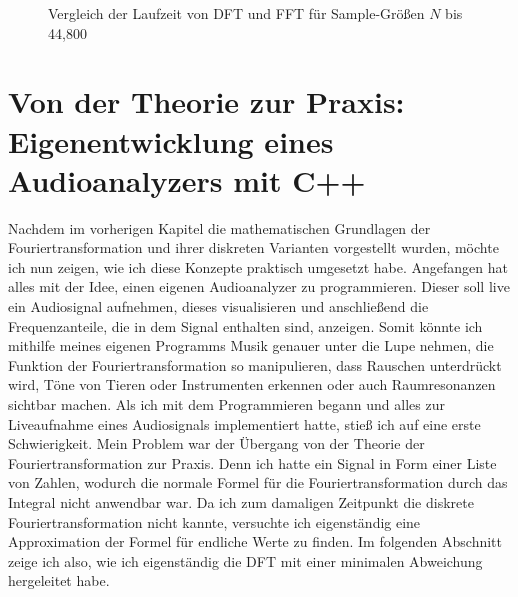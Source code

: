 \documentclass[a4paper,12pt]{article}
\theoremstyle{definition}
\theoremstyle{remark}
\begin{document}
\begin{figure}[H]
\centering
{}
\caption{Vergleich der Laufzeit von DFT und FFT für Sample-Größen $N$ bis 44{,}800}
\end{figure}



\section{Von der Theorie zur Praxis: Eigenentwicklung eines Audioanalyzers mit C++}
Nachdem im vorherigen Kapitel die mathematischen Grundlagen der Fouriertransformation und 
ihrer diskreten Varianten vorgestellt wurden, möchte ich nun zeigen, wie ich diese Konzepte 
praktisch umgesetzt habe. Angefangen hat alles mit der Idee, einen eigenen Audioanalyzer zu 
programmieren. Dieser soll live ein Audiosignal aufnehmen, dieses visualisieren und anschließend 
die Frequenzanteile, die in dem Signal enthalten sind, anzeigen. Somit könnte ich mithilfe 
meines eigenen Programms Musik genauer unter die Lupe nehmen, die Funktion der Fouriertransformation 
so manipulieren, dass Rauschen unterdrückt wird, Töne von Tieren oder Instrumenten erkennen 
oder auch Raumresonanzen sichtbar machen. Als ich mit dem Programmieren begann und alles 
zur Liveaufnahme eines Audiosignals implementiert hatte, stieß ich auf eine erste Schwierigkeit. 
Mein Problem war der Übergang von der Theorie der Fouriertransformation zur Praxis. Denn 
ich hatte ein Signal in Form einer Liste von Zahlen, wodurch die normale Formel für die 
Fouriertransformation durch das Integral nicht anwendbar war. Da ich zum damaligen Zeitpunkt 
die diskrete Fouriertransformation nicht kannte, versuchte ich eigenständig eine Approximation 
der Formel für endliche Werte zu finden. Im folgenden Abschnitt zeige ich also, wie ich 
eigenständig die DFT mit einer minimalen Abweichung hergeleitet habe.
\end{document}
